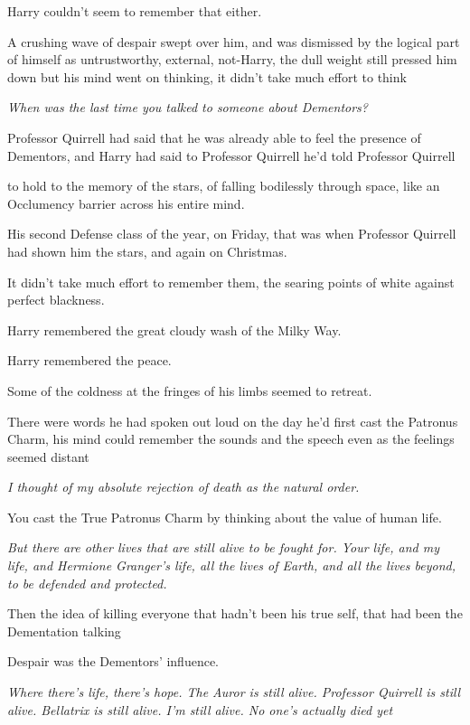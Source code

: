 Harry couldn't seem to remember that either.

A crushing wave of despair swept over him, and was dismissed by the logical
part of himself as untrustworthy, external, not-Harry, the dull weight still
pressed him down but his mind went on thinking, it didn't take much effort to
think{\el}

\emph{When was the last time you talked to someone about Dementors?}

Professor Quirrell had said that he was already able to feel the presence of
Dementors, and Harry had said to Professor Quirrell{\el} he'd told Professor
Quirrell{\el}

{\el} to hold to the memory of the stars, of falling bodilessly through
space, like an Occlumency barrier across his entire mind.

His second Defense class of the year, on Friday, that was when Professor
Quirrell had shown him the stars, and again on Christmas.

It didn't take much effort to remember them, the searing points of white
against perfect blackness.

Harry remembered the great cloudy wash of the Milky Way.

Harry remembered the peace.

Some of the coldness at the fringes of his limbs seemed to retreat.

There were words he had spoken out loud on the day he'd first cast the Patronus
Charm, his mind could remember the sounds and the speech even as the feelings
seemed distant{\el}

{\el} \emph{I thought of my absolute rejection of death as the natural order.}

You cast the True Patronus Charm by thinking about the value of human life.

\emph{{\el}But there are other lives that are still alive to be fought for.
Your life, and my life, and Hermione Granger's life, all the lives of Earth,
and all the lives beyond, to be defended and protected.}

Then the idea of killing everyone{\el} that hadn't been his true self, that
had been the Dementation talking{\el}

Despair was the Dementors' influence.

\emph{Where there's life, there's hope. The Auror is still alive. Professor
Quirrell is still alive. Bellatrix is still alive. I'm still alive. No one's
actually died yet{\el}}

